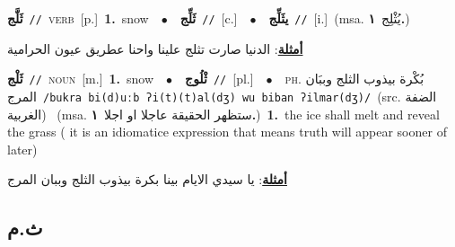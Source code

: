 \documentclass[10pt,a4paper,twoside]{article} %
\begin{document}
\begin{multicols}{2}
{\setlength\topsep{0pt}\textbf{\foreignlanguage{arabic}{ثَلَّج}}\ {\color{gray}\texttt{//}\color{black}}\ \textsc{verb}\ [p.]\ \textbf{1.}~snow\ \ $\bullet$\ \ \setlength\topsep{0pt}\textbf{\foreignlanguage{arabic}{ثَلِّج}}\ {\color{gray}\texttt{//}\color{black}}\ [c.]\ \ $\bullet$\ \ \setlength\topsep{0pt}\textbf{\foreignlanguage{arabic}{يثَلِّج}}\ {\color{gray}\texttt{//}\color{black}}\ [i.]\ \color{gray}(msa. \foreignlanguage{arabic}{يُثْلِج}~\foreignlanguage{arabic}{\textbf{١.}})\color{black}\  \begin{flushright}\color{gray}\foreignlanguage{arabic}{\textbf{\underline{\foreignlanguage{arabic}{أمثلة}}}: الدنيا صارت تثلج علينا واحنا عطريق عيون الحرامية}\end{flushright}\color{black}} \vspace{2mm}

{\setlength\topsep{0pt}\textbf{\foreignlanguage{arabic}{ثَلْج}}\ {\color{gray}\texttt{//}\color{black}}\ \textsc{noun}\ [m.]\ \textbf{1.}~snow\ \ $\bullet$\ \ \setlength\topsep{0pt}\textbf{\foreignlanguage{arabic}{ثْلُوج}}\ {\color{gray}\texttt{//}\color{black}}\ [pl.]\ \ $\bullet$\ \ \textsc{ph.} \color{gray} \foreignlanguage{arabic}{بُكْرة بيذوب الثلج وببَان المرج}\color{black}\ {\color{gray}\texttt{/{\sffamily bukra bi(d)uːb ʔi(t)(t)al(dʒ) wu biban ʔilmar(dʒ)}/}\color{black}}\ \color{gray}(src. \foreignlanguage{arabic}{الضفة الغربية})\color{black}\ \color{gray} (msa. \foreignlanguage{arabic}{ستظهر الحقيقة عاجلا او اجلا}~\foreignlanguage{arabic}{\textbf{١.}})\color{black}\ \textbf{1.}~the ice shall melt and reveal the grass ( it is an idiomatice expression that means truth will appear sooner of later)\  \begin{flushright}\color{gray}\foreignlanguage{arabic}{\textbf{\underline{\foreignlanguage{arabic}{أمثلة}}}: يا سيدي الايام بينا بكرة بيذوب الثلج وببان المرج}\end{flushright}\color{black}} \vspace{2mm}

\vspace{-3mm}
\subsection*{\color{blue}\foreignlanguage{arabic}{ث.م}\color{blue}{ (ntws)}} 


\end{multicols}
\end{document}
